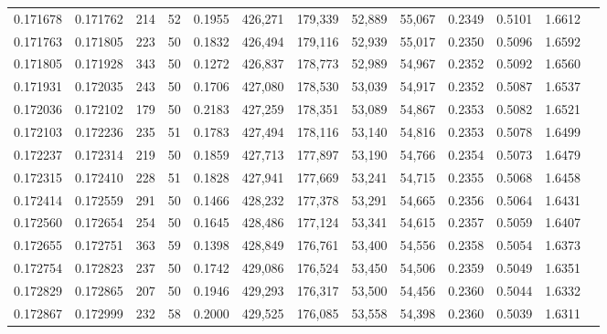 \begin{tabular}{rrrrrrrrrrrrr}
0.171678 & 0.171762 &   214 &  52 &                                     0.1955 & 426,271 & 179,339 &  52,889 &  55,067 & 0.2349 & 0.5101 & 1.6612 \\
0.171763 & 0.171805 &   223 &  50 &                                     0.1832 & 426,494 & 179,116 &  52,939 &  55,017 & 0.2350 & 0.5096 & 1.6592 \\
0.171805 & 0.171928 &   343 &  50 &                                     0.1272 & 426,837 & 178,773 &  52,989 &  54,967 & 0.2352 & 0.5092 & 1.6560 \\
0.171931 & 0.172035 &   243 &  50 &                                     0.1706 & 427,080 & 178,530 &  53,039 &  54,917 & 0.2352 & 0.5087 & 1.6537 \\
0.172036 & 0.172102 &   179 &  50 &                                     0.2183 & 427,259 & 178,351 &  53,089 &  54,867 & 0.2353 & 0.5082 & 1.6521 \\
0.172103 & 0.172236 &   235 &  51 &                                     0.1783 & 427,494 & 178,116 &  53,140 &  54,816 & 0.2353 & 0.5078 & 1.6499 \\
0.172237 & 0.172314 &   219 &  50 &                                     0.1859 & 427,713 & 177,897 &  53,190 &  54,766 & 0.2354 & 0.5073 & 1.6479 \\
0.172315 & 0.172410 &   228 &  51 &                                     0.1828 & 427,941 & 177,669 &  53,241 &  54,715 & 0.2355 & 0.5068 & 1.6458 \\
0.172414 & 0.172559 &   291 &  50 &                                     0.1466 & 428,232 & 177,378 &  53,291 &  54,665 & 0.2356 & 0.5064 & 1.6431 \\
0.172560 & 0.172654 &   254 &  50 &                                     0.1645 & 428,486 & 177,124 &  53,341 &  54,615 & 0.2357 & 0.5059 & 1.6407 \\
0.172655 & 0.172751 &   363 &  59 &                                     0.1398 & 428,849 & 176,761 &  53,400 &  54,556 & 0.2358 & 0.5054 & 1.6373 \\
0.172754 & 0.172823 &   237 &  50 &                                     0.1742 & 429,086 & 176,524 &  53,450 &  54,506 & 0.2359 & 0.5049 & 1.6351 \\
0.172829 & 0.172865 &   207 &  50 &                                     0.1946 & 429,293 & 176,317 &  53,500 &  54,456 & 0.2360 & 0.5044 & 1.6332 \\
0.172867 & 0.172999 &   232 &  58 &                                     0.2000 & 429,525 & 176,085 &  53,558 &  54,398 & 0.2360 & 0.5039 & 1.6311 \\

\end{tabular}
